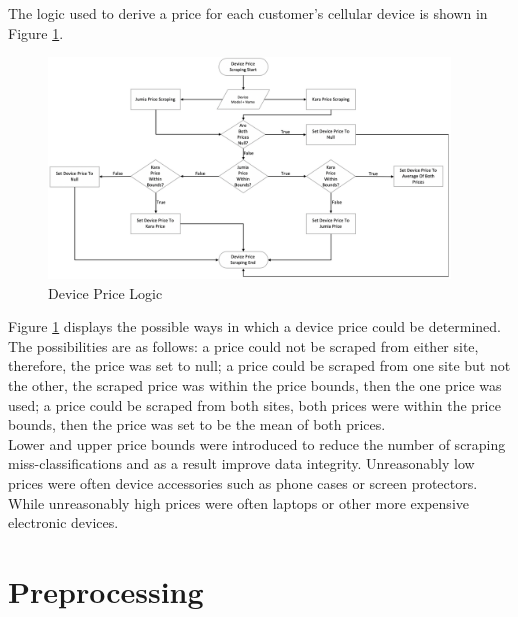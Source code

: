 The logic used to derive a price for each customer's cellular device is shown in Figure \ref{fig:device}.

\vspace{10pt}

\begin{figure}[!htb]
\centering
\includegraphics[width=0.95\textwidth]{images/device_price.png}
\caption{Device Price Logic}
\label{fig:device}
\end{figure}

\vspace{10pt}


Figure \ref{fig:device} displays the possible ways in which a device price could be determined. The possibilities are as follows: a price could not be scraped from either site, therefore, the price was set to null; a price could be scraped from one site but not the other, the scraped price was within the price bounds, then the one price was used; a price could be scraped from both sites, both prices were within the price bounds, then the price was set to be the mean of both prices. \\

Lower and upper price bounds were introduced to reduce the number of scraping miss-classifications and as a result improve data integrity. Unreasonably low prices were often device accessories such as phone cases or screen protectors. While unreasonably high prices were often laptops or other more expensive electronic devices. \newpage


\section{Preprocessing}

